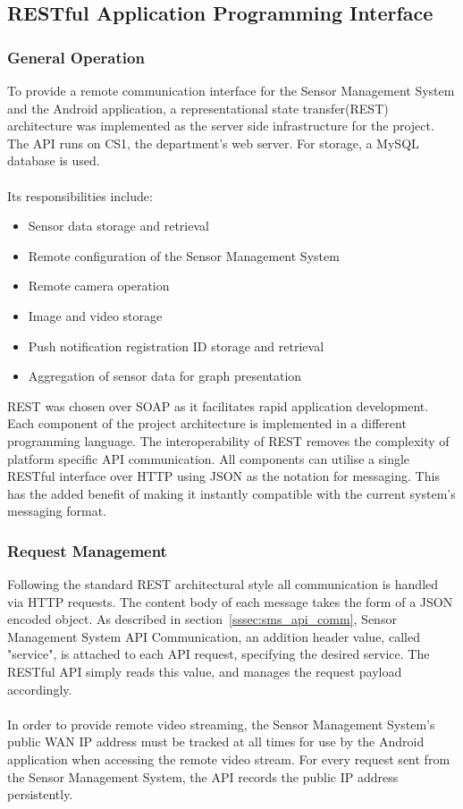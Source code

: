 \documentclass{article}
\begin{document}
\newpage

\subsection{RESTful Application Programming Interface}
\subsubsection{General Operation}
To provide a remote communication interface for the Sensor Management System and the Android application, a representational state transfer(REST) architecture was implemented as the server side infrastructure for the project. The API runs on CS1, the department\rq s web server. For storage, a MySQL database is used.  \\\\
Its responsibilities include:
\begin{itemize}
  \item Sensor data storage and retrieval
  \item Remote configuration of the Sensor Management System
  \item Remote camera operation
  \item Image and video storage
  \item Push notification registration ID storage and retrieval
  \item Aggregation of sensor data for graph presentation
\end{itemize}
REST was chosen over SOAP as it facilitates rapid application development. Each component of the project architecture is implemented in a different programming language. The interoperability of REST removes the complexity of platform specific API communication. All components can utilise a single RESTful interface over HTTP using  JSON as the notation for messaging. This has the added benefit of making it instantly compatible with the current system’s messaging format.

\subsubsection{Request Management}
Following the standard REST architectural style all communication is handled via HTTP requests. The content body of each message takes the form of a JSON encoded object. As described in section~\ref{sssec:sms_api_comm}, Sensor Management System API Communication, an addition header value, called "service", is attached to each API request, specifying the desired service. The RESTful API simply reads this value, and manages the request payload accordingly. \\\\
In order to provide remote video streaming, the Sensor Management System\rq s public WAN IP address must be tracked at all times for use by the Android application when accessing the remote video stream. For every request sent from the Sensor Management System, the API records the public IP address persistently.
\end{document}
